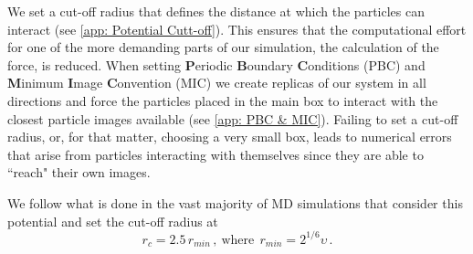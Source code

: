 \documentclass[../../main.tex]{subfiles}
\begin{document}
    We set a cut-off radius that defines the distance at which the particles can interact (see \cref{app: Potential Cutt-off}). This ensures that the computational effort for one of the more demanding parts of our simulation, the calculation of the force, is reduced. When setting \textbf{P}eriodic \textbf{B}oundary \textbf{C}onditions (PBC) and \textbf{M}inimum \textbf{I}mage \textbf{C}onvention (MIC) we create replicas of our system in all directions and force the particles placed in the main box to interact with the closest particle images available (see \cref{app: PBC & MIC}). Failing to set a cut-off radius, or, for that matter, choosing a very small box, leads to numerical errors that arise from particles interacting with themselves since they are able to ``reach" their own images.
    
    We follow what is done in the vast majority of MD simulations that consider this potential \cite{allenComputerSimulationLiquids2017} and set the cut-off radius at
        \begin{equation}
            r_c = 2.5\,r_{min}\,, \ \text{where} \,\; r_{min} = 2^{1/6}\upsilon \,. 
        \end{equation} 
    
\end{document}
